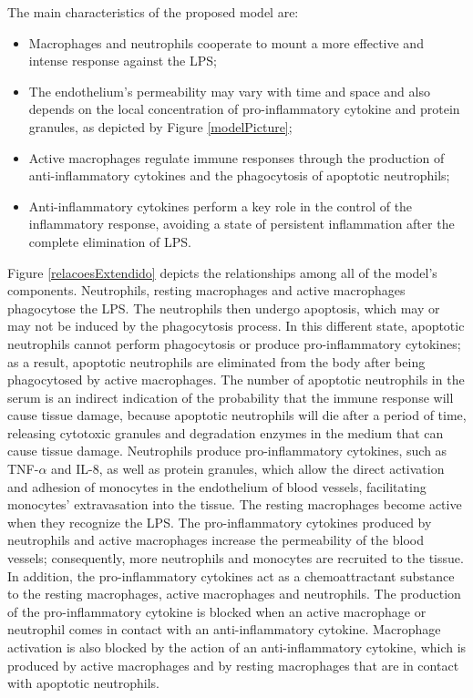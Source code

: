 \documentclass[10pt]{bmc_article}
\newenvironment{bmcformat}{\baselineskip20pt\sloppy\setboolean{publ}{false}}{\baselineskip20pt\sloppy}
\begin{document}
\begin{bmcformat}
The main characteristics of the proposed model are: 
\begin{itemize}
\item Macrophages and neutrophils cooperate to mount a more effective and intense response against the LPS; 
\item The endothelium's permeability may vary with time and space and also depends on the local concentration of pro-inflammatory 
cytokine and protein granules, as depicted by Figure \ref{modelPicture}; 
\item Active macrophages regulate immune responses through the production of anti-inflammatory cytokines and the phagocytosis of 
apoptotic neutrophils; 
\item Anti-inflammatory cytokines perform a key role in the control of the inflammatory response, avoiding a state of persistent 
inflammation after the complete elimination of LPS. 
\end{itemize}

Figure \ref{relacoesExtendido} depicts the relationships among all of the model's components. Neutrophils, resting macrophages and 
active macrophages phagocytose the LPS. The neutrophils then undergo apoptosis, which may or may not be induced by the phagocytosis 
process. In this different state, apoptotic neutrophils cannot perform phagocytosis or produce pro-inflammatory cytokines; as a result, 
apoptotic neutrophils are eliminated from the body after being phagocytosed by active macrophages. The number of apoptotic neutrophils 
in the serum is an indirect indication of the probability that the immune response will cause tissue damage, because apoptotic 
neutrophils will die after a period of time, releasing cytotoxic granules and degradation enzymes in the medium that can cause tissue 
damage. Neutrophils produce pro-inflammatory cytokines, such as TNF-$\alpha$ and IL-8, as well as protein granules, which allow the 
direct activation and adhesion of monocytes in the endothelium of blood vessels, facilitating monocytes' extravasation into the tissue. 
The resting macrophages become active when they recognize the LPS. The pro-inflammatory cytokines produced by neutrophils and active 
macrophages increase the permeability of the blood vessels; consequently, more neutrophils and monocytes are recruited to the tissue. 
In addition, the pro-inflammatory cytokines act as a chemoattractant substance to the resting macrophages, active macrophages and 
neutrophils. The production of the pro-inflammatory cytokine is blocked when an active macrophage or neutrophil comes in contact with 
an anti-inflammatory cytokine. Macrophage activation is also blocked by the action of an anti-inflammatory cytokine, which is produced 
by active macrophages and by resting macrophages that are in contact with apoptotic neutrophils. 


\end{bmcformat}
\end{document}
